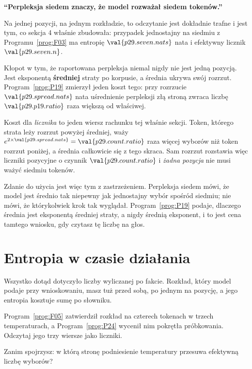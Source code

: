 \begin{fr}
\begin{trapbox}
\textbf{\enquote{Perpleksja siedem znaczy, że model rozważał siedem
tokenów.}}

Na jednej pozycji, na jednym rozkładzie, to odczytanie jest dokładnie trafne i
jest tym, co sekcja 4 właśnie zbudowała: przypadek jednostajny na siedmiu z
Programu~\ref{prog:F03} ma entropię $\val{p29.seven.nats}$ nata i efektywny
licznik $\val{p29.seven.n}$.

Kłopot w tym, że raportowana perpleksja niemal nigdy nie jest jedną pozycją.
Jest eksponentą \textbf{średniej} straty po korpusie, a średnia ukrywa swój
rozrzut. Program~\ref{prog:P19} zmierzył jeden koszt tego: przy rozrzucie
$\val{p29.spread.nats}$ nata uśrednienie perpleksji złą stroną zwraca liczbę
$\val{p29.p19.ratio}$ raza większą od właściwej.

Koszt dla \emph{licznika} to jeden wiersz rachunku tej właśnie sekcji. Token,
którego strata leży rozrzut powyżej średniej, waży
$e^{2 \times \val{p29.spread.nats}} = \val{p29.count.ratio}$ raza więcej
wyborów niż token rozrzut poniżej, a średnia całkowicie się z tego skraca. Sam
rozrzut rozstawia więc liczniki pozycyjne o czynnik $\val{p29.count.ratio}$ i
\emph{żadna pozycja} nie musi ważyć siedmiu tokenów.

Zdanie do użycia jest więc tym z zastrzeżeniem. Perpleksja siedem mówi, że
model jest średnio tak niepewny jak jednostajny wybór spośród siedmiu; nie
mówi, że którykolwiek krok tak wyglądał. Program~\ref{prog:P19} podaje,
dlaczego średnia jest eksponentą średniej straty, a nigdy średnią eksponent, i
to jest cena tamtego wniosku, gdy czytasz tę liczbę na głos.
\end{trapbox}
\end{fr}

\section{Entropia w czasie działania}
\label{sec:P29-runtime}

\begin{fr}
Wszystko dotąd dotyczyło liczby wyliczanej po fakcie. Rozkład, który model
podaje przy wnioskowaniu, masz tuż przed sobą, po jednym na pozycję, a jego
entropia kosztuje sumę po słowniku.

Program~\ref{prog:F05} zatwierdził rozkład na czterech tokenach w trzech
temperaturach, a Program~\ref{prog:P24} wycenił nim pokrętła próbkowania.
Odczytaj jego trzy wiersze jako liczniki.

Zanim spojrzysz: w którą stronę podniesienie temperatury przesuwa efektywną
liczbę wyborów?
\dotline
\nextframe
\end{fr}

